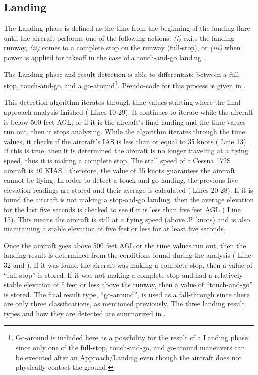         
    
    \subsection{Landing}
    
    The Landing phase is defined as the time from the beginning of the landing flare until the aircraft performs one of the following actions: \textit{(i)} exits the landing runway, \textit{(ii)} comes to a complete stop on the runway (full-stop), or \textit{(iii)} when power is applied for takeoff in the case of a touch-and-go landing~\cite{cictt2013phase}.
    
    The Landing phase and result detection is able to differentiate between a full-stop, touch-and-go, and a go-around\footnote{Go-around is included here as a possibility for the result of a Landing phase since only one of the full-stop, touch-and-go, and go-around maneuvers can be executed after an Approach/Landing even though the aircraft does not physically contact the ground.}.  Pseudo-code for this process is given in .
    
    This detection algorithm iterates through time values starting where the final approach analysis finished ( Lines 10-29).  It continues to iterate while the aircraft is below 500 feet AGL; or if it is the aircraft's final landing and the time values run out, then it stops analyzing.  While the algorithm iterates through the time values, it checks if the aircraft's IAS is less than or equal to 35 knots ( Line 13).  If this is true, then it is determined the aircraft is no longer traveling at a flying speed, thus it is making a complete stop.  The stall speed of a Cessna 172S aircraft is 40 KIAS~\cite{und_poh}; therefore, the value of 35 knots guarantees the aircraft cannot be flying.  In order to detect a touch-and-go landing, the previous five elevation readings are stored and their average is calculated ( Lines 20-28).  If it is found the aircraft is not making a stop-and-go landing, then the average elevation for the last five seconds is checked to see if it is less than five feet AGL ( Line 15).  This means the aircraft is still at a flying speed (above 35 knots) and is also maintaining a stable elevation of five feet or less for at least five seconds.
    
    Once the aircraft goes above 500 feet AGL or the time values run out, then the landing result is determined from the conditions found during the analysis ( Line 32 and ).  If it was found the aircraft was making a complete stop, then a value of ``full-stop'' is stored.  If it was not making a complete stop and had a relatively stable elevation of 5 feet or less above the runway, then a value of ``touch-and-go'' is stored.  The final result type, ``go-around'', is used as a fall-through since there are only three classifications, as mentioned previously.  The three landing result types and how they are detected are summarized in .
    
